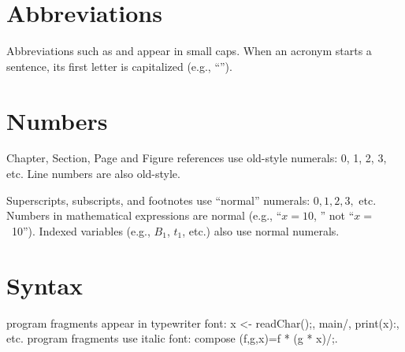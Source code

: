 \dodocclass

\fancyhf{}
\numbersoff


\section*{Abbreviations}
Abbreviations such as \mil and \cfg appear in small caps. When an
acronym starts a sentence, its first letter is capitalized (e.g.,
``\Mil'').

\section*{Numbers}
Chapter, Section, Page and Figure references use old-style numerals:
0, 1, 2, 3, etc.  Line numbers are also old-style.

Superscripts, subscripts, and footnotes use ``normal'' numerals: $0,
1, 2, 3,$ etc.  Numbers in mathematical expressions are normal (e.g.,
``$x = 10$, '' not ``$x = $\ 10'').  Indexed variables (e.g., $B_1$,
$t_1$, etc.) also use normal numerals.

\section*{Syntax}
\Mil program fragments appear in typewriter font: \binds x <- \goto readChar();,
\lab main/, \block print(x):, etc. \lamC program fragments use italic
font: \lcdef compose (f,g,x)=\lcapp f * (g * x)/;.


